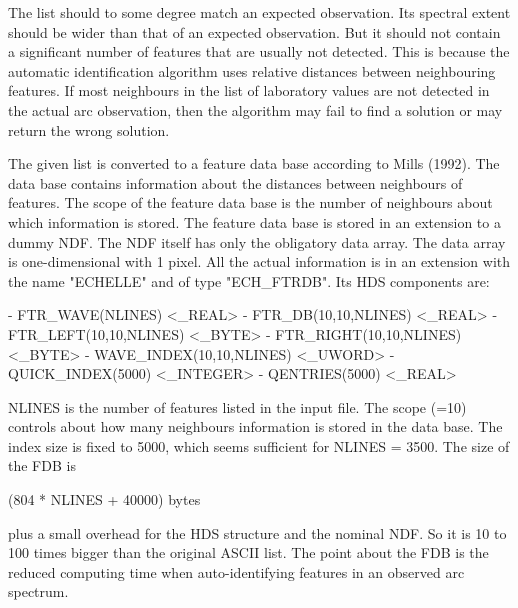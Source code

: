 \begin{description}
\begin{terminalv}
   The list should to some degree match an expected observation. Its
   spectral extent should be wider than that of an expected
   observation. But it should not contain a significant number of
   features that are usually not detected. This is because the
   automatic identification algorithm uses relative distances between
   neighbouring features. If most neighbours in the list of
   laboratory values are not detected in the actual arc observation,
   then the algorithm may fail to find a solution or may return the
   wrong solution.

   The given list is converted to a feature data base according to
   Mills (1992). The data base contains information about the
   distances between neighbours of features. The scope of the feature
   data base is the number of neighbours about which information is
   stored. The feature data base is stored in an extension to a dummy
   NDF. The NDF itself has only the obligatory data array. The data
   array is one-dimensional with 1 pixel. All the actual information
   is in an extension with the name "ECHELLE" and of type
   "ECH_FTRDB". Its HDS components are:

   -  FTR_WAVE(NLINES)           <_REAL>
   -  FTR_DB(10,10,NLINES)       <_REAL>
   -  FTR_LEFT(10,10,NLINES)     <_BYTE>
   -  FTR_RIGHT(10,10,NLINES)    <_BYTE>
   -  WAVE_INDEX(10,10,NLINES)   <_UWORD>
   -  QUICK_INDEX(5000)          <\_INTEGER>
   -  QENTRIES(5000)             <_REAL>

   NLINES is the number of features listed in the input file. The
   scope (=10) controls about how many neighbours information is
   stored in the data base. The index size is fixed to 5000, which
   seems sufficient for NLINES = 3500. The size of the FDB is

      (804 * NLINES + 40000) bytes

   plus a small overhead for the HDS structure and the nominal NDF.
   So it is 10 to 100 times bigger than the original ASCII list. The
   point about the FDB is the reduced computing time when
   auto-identifying features in an observed arc spectrum.

\end{terminalv}
\end{description}
